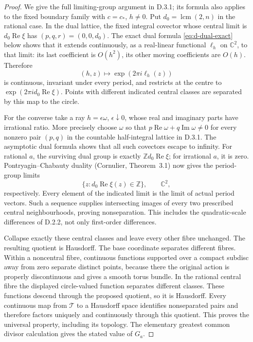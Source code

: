 \begin{proof}
We give the full limiting-group argument in D.3.1; its formula also
applies to the fixed boundary family with \(c=c_*\), \(h\ne0\).
Put \(d_0=\operatorname{lcm}(2,n)\) in the rational case. In the dual
lattice, the fixed integral covector whose central limit is
\(d_0\operatorname{Re}\xi\) has
\((p,q,r)=(0,0,d_0)\). The exact dual formula
\eqref{eq:d-dual-exact} below shows that it extends continuously, as a
real-linear functional \(\ell_h\) on \(\mathbb C^2\), to that limit:
its last coefficient is \(O(h^2)\), its other moving coefficients
are \(O(h)\). Therefore
\[
 (h,z)\longmapsto\exp(2\pi i\ell_h(z))
\]
is continuous, invariant under every period, and restricts at the
centre to \(\exp(2\pi i d_0\operatorname{Re}\xi)\).
Points with different indicated central classes are separated by this
map to the circle.

For the converse take a ray \(h=\epsilon\omega\),
\(\epsilon\downarrow0\), whose real and imaginary parts have
irrational ratio. More precisely choose \(\omega\) so that
\(p\operatorname{Re}\omega+q\operatorname{Im}\omega\ne0\)
for every nonzero pair \((p,q)\) in the countable half-integral
lattice in D.3.1. The asymptotic dual formula shows that all such
covectors escape to infinity. For rational \(a\), the surviving dual
group is exactly \(\mathbb Z d_0\operatorname{Re}\xi\); for
irrational \(a\), it is zero. Pontryagin--Chabauty duality
(Cornulier, Theorem~3.1) now gives the period-group limits
\[
 \{z:d_0\operatorname{Re}\xi(z)\in\mathbb Z\},\qquad
 \mathbb C^2,
\]
respectively. Every element of the indicated limit is the limit of
actual period vectors. Such a sequence supplies intersecting images
of every two prescribed central neighbourhoods, proving
nonseparation. This includes the quadratic-scale differences of
D.2.2, not only first-order differences.

Collapse exactly these central classes and leave every other fibre
unchanged. The resulting quotient is Hausdorff. The base coordinate
separates different fibres. Within a noncentral fibre, continuous
functions supported over a compact subdisc away from zero separate
distinct points, because there the original action is properly
discontinuous and gives a smooth torus bundle. In the rational central
fibre the displayed circle-valued function separates different
classes. These functions descend through the proposed quotient, so
it is Hausdorff. Every continuous map from \(\mathcal T\) to a
Hausdorff space identifies nonseparated pairs and therefore factors
uniquely and continuously through this quotient. This proves the
universal property, including its topology. The elementary greatest
common divisor calculation gives the stated value of \(G_a\).
\end{proof}


